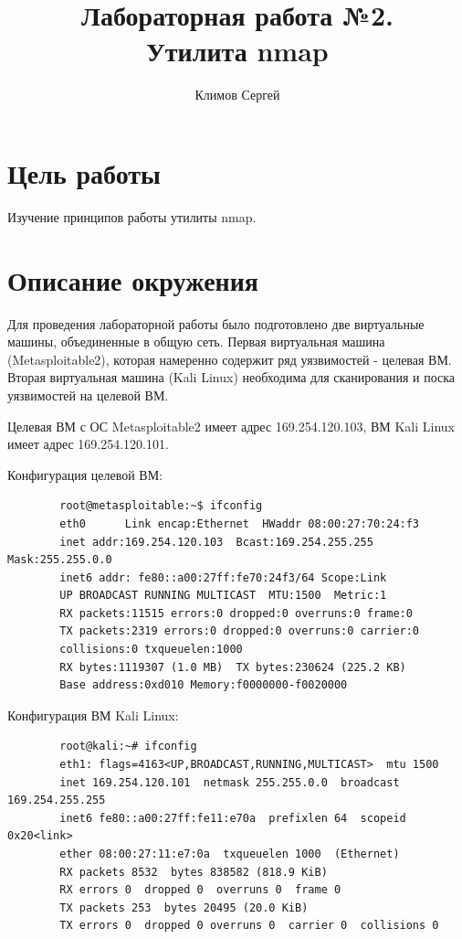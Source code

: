 \documentclass[10pt,a4paper]{report}
\author{Климов Сергей}
\title{Лабораторная работа №2.\\
	Утилита nmap}
\begin{document}
\maketitle
\tableofcontents
\pagebreak
	
\section{Цель работы}
Изучение принципов работы утилиты nmap.
\section{Описание окружения}
		Для проведения лабораторной работы было подготовлено две виртуальные машины, объединенные в общую сеть. Первая виртуальная машина (Metasploitable2), которая намеренно содержит ряд уязвимостей - целевая ВМ. Вторая виртуальная машина (Kali Linux) необходима для сканирования и поска уязвимостей на целевой ВМ.
		
		Целевая ВМ с ОС Metasploitable2 имеет адрес 169.254.120.103, ВМ Kali Linux имеет адрес 169.254.120.101.
		
		Конфигурация целевой ВМ:
		\begin{verbatim}  
        root@metasploitable:~$ ifconfig                                                
		eth0      Link encap:Ethernet  HWaddr 08:00:27:70:24:f3  
        inet addr:169.254.120.103  Bcast:169.254.255.255  Mask:255.255.0.0
        inet6 addr: fe80::a00:27ff:fe70:24f3/64 Scope:Link
        UP BROADCAST RUNNING MULTICAST  MTU:1500  Metric:1
        RX packets:11515 errors:0 dropped:0 overruns:0 frame:0
        TX packets:2319 errors:0 dropped:0 overruns:0 carrier:0
        collisions:0 txqueuelen:1000 
        RX bytes:1119307 (1.0 MB)  TX bytes:230624 (225.2 KB)
        Base address:0xd010 Memory:f0000000-f0020000 
		\end{verbatim}
		
		Конфигурация ВМ Kali Linux:
		\begin{verbatim}
		root@kali:~# ifconfig
		eth1: flags=4163<UP,BROADCAST,RUNNING,MULTICAST>  mtu 1500
        inet 169.254.120.101  netmask 255.255.0.0  broadcast 169.254.255.255
        inet6 fe80::a00:27ff:fe11:e70a  prefixlen 64  scopeid 0x20<link>
        ether 08:00:27:11:e7:0a  txqueuelen 1000  (Ethernet)
        RX packets 8532  bytes 838582 (818.9 KiB)
        RX errors 0  dropped 0  overruns 0  frame 0
        TX packets 253  bytes 20495 (20.0 KiB)
        TX errors 0  dropped 0 overruns 0  carrier 0  collisions 0
		\end{verbatim}
\end{document}

